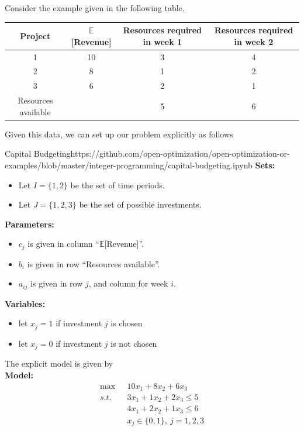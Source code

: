 \newpage
Consider the example given in the following table.
	\begin{table}[h]
			\begin{tabular}{|c|c|c|c|}%
				\hline
				Project & $\mathbb{E}$[Revenue] & Resources required in week 1 & Resources required in week 2\\\hline
				\rowcolor{gray!10} 1 & 10 & 3 & 4\\
				\hline
				2 & 8 & 1 & 2\\\hline
				\rowcolor{gray!10} 3 & 6 & 2 & 1\\
				\hline
				Resources available & & 5 & 6\\
				\hline
		\end{tabular}
	\end{table}


Given this data, we can set up our problem explicitly as follows

\begin{examplewithallcode}{Capital Budgeting}{}{https://github.com/open-optimization/open-optimization-or-examples/blob/master/integer-programming/capital-budgeting.ipynb}{}
\noindent \textbf{Sets:}
\begin{itemize}
\item Let $I = \{1,2\}$ be the set of time periods.
\item Let $J = \{1, 2,3\}$ be the set of possible investments.
\end{itemize}

\noindent \textbf{Parameters:}
\begin{itemize}
\item $c_j$ is given in column ``$\mathbb{E}$[Revenue]''.
\item $b_i$ is given in row ``Resources available''.
\item $a_{ij}$ is given in row $j$, and column for week $i$.
\end{itemize}

\noindent \textbf{Variables:}
\begin{itemize}
\item let $x_j = 1$ if investment $j$ is chosen
\item let $x_j = 0$ if investment $j$ is not chosen
\end{itemize}

The explicit model is given by\\
\noindent  \textbf{Model:}
\begin{align*}
	\max\ \ \  & 10x_1+8x_2+6x_3 \tag{Total Expected Revenue}\\
	s.t. \ \ & 
	3x_1+1x_2+2x_3\leq5 \tag{ Resource constraint week 1}\\
	&4x_1+2x_2+1x_3\leq6 \tag{ Resource constraint week 2}\\
&x_j \in \{0,1\},\  j = 1,2,3
\end{align*}

\end{examplewithallcode}
